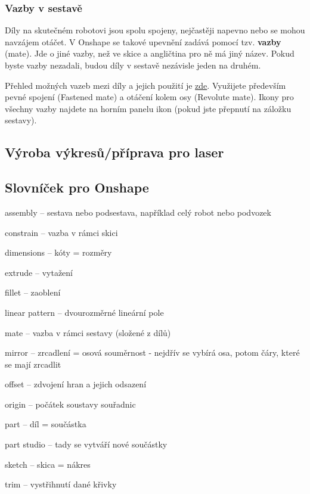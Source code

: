 \subsubsection{Vazby v sestavě}


Díly na skutečném robotovi jsou spolu spojeny, nejčastěji napevno nebo se mohou navzájem otáčet.  
V Onshape se takové upevnění zadává pomocí tzv. \textbf{vazby} (mate).
Jde o jiné vazby, než ve skice a angličtina pro ně má jiný název.  
Pokud byste vazby nezadali, budou díly v sestavě  nezávisle jeden na druhém. 

Přehled možných vazeb mezi díly a jejich použití je \href{https://cad.onshape.com/help/Content/mate.htm?TocPath=Desktop%20Help|Assemblies|Mates|_____0}{zde}.
Využijete především pevné spojení (Fastened mate) a otáčení kolem osy (Revolute mate). 
Ikony pro všechny vazby najdete na horním panelu ikon (pokud jste přepnutí na záložku sestavy).


\subsection{Výroba výkresů/příprava pro laser} \label{laser:vykresy}






\subsection{Slovníček pro Onshape}

assembly -- sestava nebo podsestava, například celý robot nebo podvozek

constrain -- vazba v rámci skici

dimensions -- kóty = rozměry 

extrude -- vytažení 

fillet -- zaoblení 

linear pattern -- dvourozměrné lineární pole 

mate -- vazba v rámci sestavy (složené z dílů)

mirror -- zrcadlení = osová souměrnost - nejdřív se vybírá osa, potom čáry, které se mají zrcadlit

offset -- zdvojení hran a jejich odsazení 

origin -- počátek soustavy souřadnic

part -- díl = součástka

part studio -- tady se vytváří nové součástky 

sketch -- skica = nákres 

trim -- vystřihnutí dané křivky 










